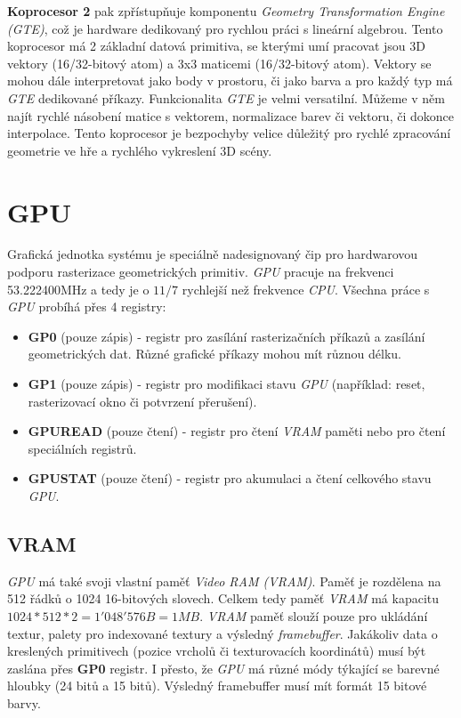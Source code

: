 \textbf{Koprocesor 2} pak zpřístupňuje komponentu \textit{Geometry Transformation Engine (GTE)}, což je hardware dedikovaný
pro rychlou práci s lineární algebrou. Tento koprocesor má 2 základní datová primitiva, se kterými umí pracovat jsou 3D vektory (16/32-bitový atom) a 3x3 maticemi (16/32-bitový atom).
Vektory se mohou dále interpretovat jako body v prostoru, či jako barva a pro každý typ má \textit{GTE} dedikované příkazy.
Funkcionalita \textit{GTE} je velmi versatilní. Můžeme v něm najít rychlé násobení matice s vektorem, normalizace barev či vektoru, či dokonce interpolace.
Tento koprocesor je bezpochyby velice důležitý pro rychlé zpracování geometrie ve hře a rychlého vykreslení 3D scény.

\section{GPU}

Grafická jednotka systému je speciálně nadesignovaný čip pro hardwarovou podporu rasterizace geometrických primitiv.
\textit{GPU} pracuje na frekvenci 53.222400MHz a tedy je o $11/7$ rychlejší než frekvence \textit{CPU}. Všechna práce s \textit{GPU} probíhá přes
4 registry:

\begin{itemize}
    \item{\textbf{GP0} (pouze zápis) - registr pro zasílání rasterizačních příkazů a zasílání geometrických dat. Různé grafické příkazy mohou mít různou délku.}
    \item{\textbf{GP1} (pouze zápis) - registr pro modifikaci stavu \textit{GPU} (například: reset, rasterizovací okno či potvrzení přerušení).}
    \item{\textbf{GPUREAD} (pouze čtení) - registr pro čtení \textit{VRAM} paměti nebo pro čtení speciálních registrů.}
    \item{\textbf{GPUSTAT} (pouze čtení) - registr pro akumulaci a čtení celkového stavu \textit{GPU}.}
\end{itemize}

\subsection{VRAM}

\textit{GPU} má také svoji vlastní paměť \textit{Video RAM (VRAM)}. Paměť je rozdělena na 512 řádků o 1024 16-bitových slovech.
Celkem tedy paměť \textit{VRAM} má kapacitu $1024*512*2=1'048'576B=1MB$. \textit{VRAM} paměť slouží pouze pro ukládání textur, palety pro
indexované textury a výsledný \textit{framebuffer}. Jakákoliv data o kreslených primitivech (pozice vrcholů či texturovacích koordinátů)
musí být zaslána přes \textbf{GP0} registr. I přesto, že \textit{GPU} má různé módy týkající se barevné hloubky (24 bitů a 15 bitů).
Výsledný framebuffer musí mít formát 15 bitové barvy.

